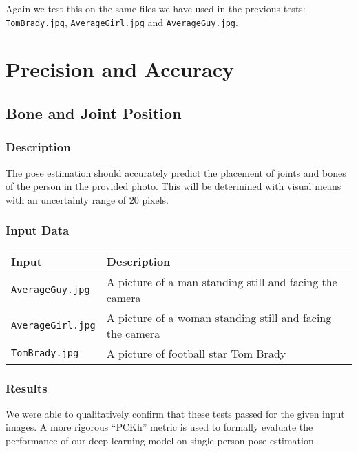 \documentclass{scrreprt}
\begin{document}
Again we test this on the same files we have used in the previous tests:
\verb|TomBrady.jpg|, \verb|AverageGirl.jpg| and \verb|AverageGuy.jpg|.

\section{Precision and Accuracy}
\subsection{Bone and Joint Position}
\subsubsection{Description}

The pose estimation should accurately predict the placement of joints and bones
of the person in the provided photo. This will be determined with visual means
with an uncertainty range of 20 pixels.

\subsubsection{Input Data}

\begin{table}[H]
        \centering
        \begin{tabular}{p{3cm}p{6cm}}
                \hline\hline
                Input & Description\\
                \hline\hline
                \verb|AverageGuy.jpg| &  A picture of a man standing still and facing the camera\\
                \hline
                \verb|AverageGirl.jpg| &  A picture of a woman standing still and facing the camera\\
                \hline
                \verb|TomBrady.jpg| &  A picture of football star Tom Brady\\
                \hline
        \end{tabular}
\end{table}

\subsubsection{Results}

We were able to qualitatively confirm that these tests passed for the given
input images. A more rigorous ``PCKh'' metric is used to formally evaluate the
performance of our deep learning model on single-person pose estimation.
\end{document}
